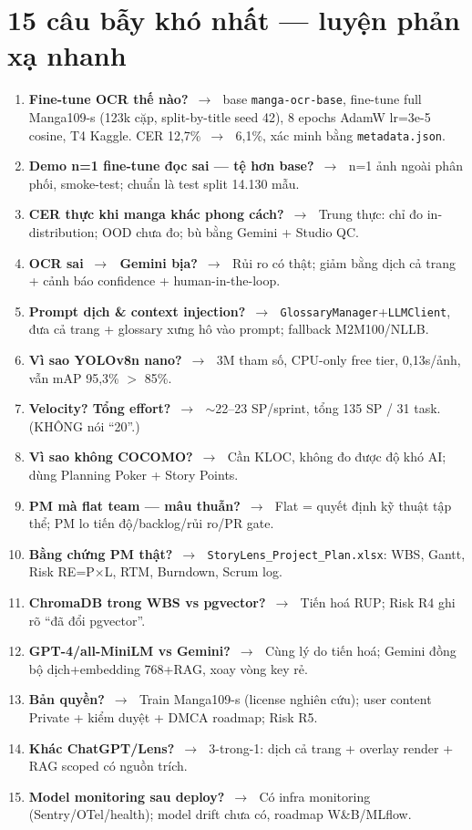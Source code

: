\documentclass[11pt]{article}
\newcommand{\arr}{\,\ensuremath{\rightarrow}\,}
\newcommand{\x}{\ensuremath{\times}}
\newcommand{\code}[1]{\texttt{\small #1}}
\begin{document}
\section{15 câu bẫy khó nhất --- luyện phản xạ nhanh}

\begin{enumerate}[leftmargin=1.6em,itemsep=3pt]
  \item \textbf{Fine-tune OCR thế nào?} \arr\ base \code{manga-ocr-base}, fine-tune full Manga109-s (123k cặp, split-by-title seed 42), 8 epochs AdamW lr=3e-5 cosine, T4 Kaggle. CER 12,7\% \arr\ 6,1\%, xác minh bằng \code{metadata.json}.
  \item \textbf{Demo n=1 fine-tune đọc sai --- tệ hơn base?} \arr\ n=1 ảnh ngoài phân phối, smoke-test; chuẩn là test split 14.130 mẫu.
  \item \textbf{CER thực khi manga khác phong cách?} \arr\ Trung thực: chỉ đo in-distribution; OOD chưa đo; bù bằng Gemini + Studio QC.
  \item \textbf{OCR sai \arr\ Gemini bịa?} \arr\ Rủi ro có thật; giảm bằng dịch cả trang + cảnh báo confidence + human-in-the-loop.
  \item \textbf{Prompt dịch \& context injection?} \arr\ \code{GlossaryManager}+\code{LLMClient}, đưa cả trang + glossary xưng hô vào prompt; fallback M2M100/NLLB.
  \item \textbf{Vì sao YOLOv8n nano?} \arr\ 3M tham số, CPU-only free tier, 0,13s/ảnh, vẫn mAP 95,3\% $>$ 85\%.
  \item \textbf{Velocity? Tổng effort?} \arr\ $\sim$22--23 SP/sprint, tổng 135 SP / 31 task. (KHÔNG nói ``20''.)
  \item \textbf{Vì sao không COCOMO?} \arr\ Cần KLOC, không đo được độ khó AI; dùng Planning Poker + Story Points.
  \item \textbf{PM mà flat team --- mâu thuẫn?} \arr\ Flat = quyết định kỹ thuật tập thể; PM lo tiến độ/backlog/rủi ro/PR gate.
  \item \textbf{Bằng chứng PM thật?} \arr\ \code{StoryLens\_Project\_Plan.xlsx}: WBS, Gantt, Risk RE=P\x L, RTM, Burndown, Scrum log.
  \item \textbf{ChromaDB trong WBS vs pgvector?} \arr\ Tiến hoá RUP; Risk R4 ghi rõ ``đã đổi pgvector''.
  \item \textbf{GPT-4/all-MiniLM vs Gemini?} \arr\ Cùng lý do tiến hoá; Gemini đồng bộ dịch+embedding 768+RAG, xoay vòng key rẻ.
  \item \textbf{Bản quyền?} \arr\ Train Manga109-s (license nghiên cứu); user content Private + kiểm duyệt + DMCA roadmap; Risk R5.
  \item \textbf{Khác ChatGPT/Lens?} \arr\ 3-trong-1: dịch cả trang + overlay render + RAG scoped có nguồn trích.
  \item \textbf{Model monitoring sau deploy?} \arr\ Có infra monitoring (Sentry/OTel/health); model drift chưa có, roadmap W\&B/MLflow.
\end{enumerate}
\end{document}

